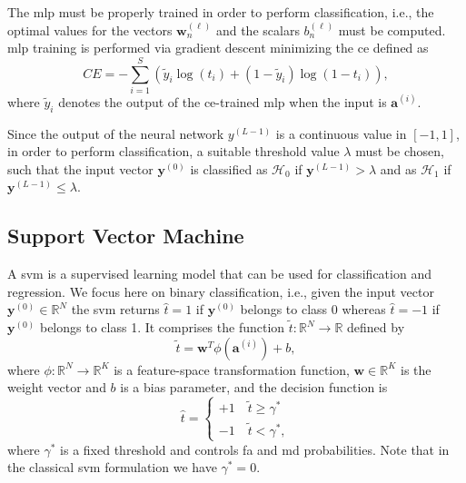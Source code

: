 \documentclass[twocolumns]{IEEEtran}
\begin{document}
The \ac{mlp} must be properly trained in order to perform classification, i.e., the optimal values for the vectors $\bm{w}_n^{(\ell)}$ and the scalars $b_n^{(\ell)}$ must be computed. \Ac{mlp} training is performed via gradient descent minimizing the \ac{ce} defined as
\begin{equation}\label{eq:ce}
CE = -\sum_{i=1}^{S}\left(\tilde{y}_i\log\left(t_i\right)+\left(1-\tilde{y}_i\right)\log\left(1-t_i\right) \right),
\end{equation}
where $\tilde{y}_i$ denotes the output of the \ac{ce}-trained \ac {mlp} when the input is $\bm{a}^{(i)}$.

Since the output of the neural network $y^{(L-1)}$ is a continuous value in $[-1,1]$, in order to perform classification, a suitable threshold value $\lambda$ must be chosen, such that the input vector $\bm{y}^{(0)}$ is classified as
$\mathcal{H}_0$ if $\bm{y}^{(L-1)} > \lambda$ and as $\mathcal{H}_1$ if $\bm{y}^{(L-1)} \le \lambda$.

\subsection{Support Vector Machine}\label{sec:svm}
A \ac{svm} \cite{Bishop2006} is a supervised learning model that can be used for classification and regression. We focus here on binary classification, i.e., given the input vector $\bm{y}^{(0)} \in \mathbb{R}^N$ the \ac{svm} returns $\hat{t} = 1$ if $\bm{y}^{(0)}$ belongs to class 0 whereas $\hat{t}=-1$ if $\bm{y}^{(0)}$ belongs to class 1. It comprises the function $\tilde{t}: \mathbb{R}^N \to \mathbb{R}$ defined by
\begin{equation}
\label{eq:svm}
\tilde{t} = \mathbf{w}^T \phi (\mathbf{a}^{(i)}) + b,
\end{equation}
where $\phi: \mathbb{R}^N \to \mathbb{R}^K$ is a feature-space transformation function, $\mathbf{w} \in \mathbb{R}^K$ is the weight vector and $b$ is a bias parameter, and the decision function is
\begin{equation}
\label{eq:cases}
\hat{t} = 
\begin{cases}
+1 \quad \tilde{t}  \geq \gamma^* \\
-1 \quad \tilde{t}  < \gamma^*,
\end{cases}		
\end{equation} 
where $\gamma^*$ is a fixed threshold and controls \ac{fa} and \ac{md} probabilities. Note that in the classical \ac{svm} formulation we have $\gamma^* = 0$.
\end{document}

